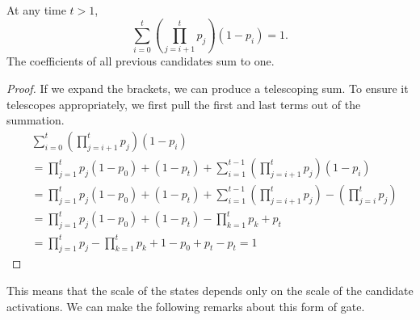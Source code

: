 \begin{prop} 
At any time \(t > 1\),
\begin{equation} \label{eq:cvexforward}
	\sum_{i=0}^t \left(\prod_{j=i+1}^t p_j\right) (1 - p_i) = 1.
\end{equation}
The coefficients of all previous candidates sum to one.
\label{prop:convexsum}
\end{prop}
\begin{proof}
If we expand the brackets, we can produce a telescoping sum. To ensure it telescopes
appropriately, we first pull the first and last terms out of the summation.
\begin{align}
    &\sum_{i=0}^t \left(\prod_{j=i+1}^t p_j\right) (1 - p_i) \\
    &= \prod_{j=1}^tp_j(1-p_0) + (1-p_t) + \sum_{i=1}^{t-1} \left(\prod_{j=i+1}^t p_j\right) (1 - p_i) \\
    &= \prod_{j=1}^tp_j(1-p_0) + (1-p_t) + \sum_{i=1}^{t-1} \left(\prod_{j=i+1}^t p_j\right) - \left(\prod_{j=i}^t p_j\right) \\
    &= \prod_{j=1}^tp_j(1-p_0) + (1-p_t) - \prod_{k=1}^t p_k + p_t \\
    &= \prod_{j=1}^tp_j - \prod_{k=1}^tp_k + 1 - p_0 + p_t - p_t = 1
\end{align}
\end{proof}
This means that the scale of the states
depends only on the scale of the candidate activations. We can make the following remarks about this form
of gate.

